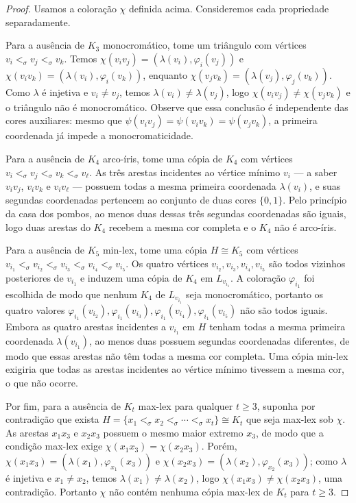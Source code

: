 \documentclass[reqno, 12pt]{amsart}
\numberwithin{equation}{section}
\theoremstyle{plain}
\theoremstyle{definition}
\begin{document}
\begin{proof}
  Usamos a coloração $\chi$ definida acima. Consideremos cada propriedade separadamente.

  Para a ausência de $K_3$ monocromático, tome um triângulo com vértices
  $v_i <_\sigma v_j <_\sigma v_k$.
  Temos $\chi(v_iv_j) = (\lambda(v_i),\varphi_i(v_j))$ e $\chi(v_iv_k) = (\lambda(v_i),\varphi_i(v_k))$,
  enquanto $\chi(v_jv_k) = (\lambda(v_j),\varphi_j(v_k))$.
  Como $\lambda$ é injetiva e $v_i \neq v_j$, temos $\lambda(v_i) \neq \lambda(v_j)$,
  logo $\chi(v_iv_j) \neq \chi(v_jv_k)$ e o triângulo não é monocromático.
  Observe que essa conclusão é independente das cores auxiliares: mesmo que
  $\psi(v_iv_j) = \psi(v_iv_k) = \psi(v_jv_k)$,
  a primeira coordenada já impede a monocromaticidade.

  Para a ausência de $K_4$ arco-íris, tome uma cópia de $K_4$ com vértices
  $v_i <_\sigma v_j <_\sigma v_k <_\sigma v_\ell$.
  As três arestas incidentes ao vértice mínimo $v_i$ --- a saber $v_iv_j$, $v_iv_k$ e $v_iv_\ell$ ---
  possuem todas a mesma primeira coordenada $\lambda(v_i)$,
  e suas segundas coordenadas pertencem ao conjunto de duas cores $\{0,1\}$.
  Pelo princípio da casa dos pombos, ao menos duas dessas três segundas coordenadas são iguais,
  logo duas arestas do $K_4$ recebem a mesma cor completa e o $K_4$ não é arco-íris.

  Para a ausência de $K_5$ min-lex, tome uma cópia $H \cong K_5$ com vértices
  $v_{i_1} <_\sigma v_{i_2} <_\sigma v_{i_3} <_\sigma v_{i_4} <_\sigma v_{i_5}$.
  Os quatro vértices $v_{i_2}, v_{i_3}, v_{i_4}, v_{i_5}$ são todos vizinhos posteriores de
  $v_{i_1}$ e induzem uma cópia de $K_4$ em $L_{v_{i_1}}$.
  A coloração $\varphi_{i_1}$ foi escolhida de modo que nenhum $K_4$ de $L_{v_{i_1}}$
  seja monocromático, portanto os quatro valores
  $\varphi_{i_1}(v_{i_2}), \varphi_{i_1}(v_{i_3}), \varphi_{i_1}(v_{i_4}), \varphi_{i_1}(v_{i_5})$
  não são todos iguais.
  Embora as quatro arestas incidentes a $v_{i_1}$ em $H$ tenham todas a mesma primeira coordenada
  $\lambda(v_{i_1})$, ao menos duas possuem segundas coordenadas diferentes,
  de modo que essas arestas não têm todas a mesma cor completa.
  Uma cópia min-lex exigiria que todas as arestas incidentes ao vértice mínimo
  tivessem a mesma cor, o que não ocorre.

  Por fim, para a ausência de $K_t$ max-lex para qualquer $t \geq 3$, suponha por
  contradição que exista $H = \{x_1 <_\sigma x_2 <_\sigma \cdots <_\sigma x_t\} \cong K_t$
  que seja max-lex sob $\chi$.
  As arestas $x_1x_3$ e $x_2x_3$ possuem o mesmo maior extremo $x_3$,
  de modo que a condição max-lex exige $\chi(x_1x_3) = \chi(x_2x_3)$.
  Porém,
  $\chi(x_1x_3) = (\lambda(x_1), \varphi_{x_1}(x_3))$ e
  $\chi(x_2x_3) = (\lambda(x_2), \varphi_{x_2}(x_3))$;
  como $\lambda$ é injetiva e $x_1 \neq x_2$, temos $\lambda(x_1) \neq \lambda(x_2)$,
  logo $\chi(x_1x_3) \neq \chi(x_2x_3)$, uma contradição.
  Portanto $\chi$ não contém nenhuma cópia max-lex de $K_t$ para $t \geq 3$.
\end{proof}
\end{document}
